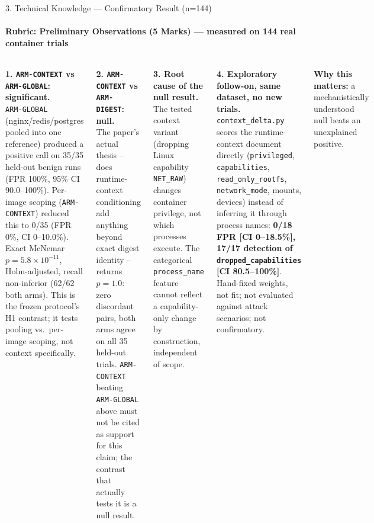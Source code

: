 \documentclass[aspectratio=169, 11pt]{beamer}
\begin{document}
\begin{frame}{3. Technical Knowledge --- Confirmatory Result (n=144)}
\framesubtitle{Rubric: Preliminary Observations (5 Marks) --- measured on 144 real container trials}

\begin{columns}[T]
\footnotesize
\textbf{1. \texttt{ARM-CONTEXT} vs \texttt{ARM-GLOBAL}: significant.}\\
\texttt{ARM-GLOBAL} (nginx/redis/postgres pooled into one reference)
produced a positive call on 35/35 held-out benign runs (FPR 100\%, 95\% CI
90.0--100\%). Per-image scoping (\texttt{ARM-CONTEXT}) reduced this to 0/35
(FPR 0\%, CI 0--10.0\%). Exact McNemar $p=5.8\times10^{-11}$, Holm-adjusted,
recall non-inferior (62/62 both arms). This is the frozen protocol's H1
contrast; it tests pooling vs.\ per-image scoping, not context specifically.

\medskip
\textbf{2. \texttt{ARM-CONTEXT} vs \texttt{ARM-DIGEST}: null.}\\
The paper's actual thesis -- does runtime-context conditioning add anything
beyond exact digest identity -- returns $p=1.0$: zero discordant pairs, both
arms agree on all 35 held-out trials. \texttt{ARM-CONTEXT} beating
\texttt{ARM-GLOBAL} above must not be cited as support for this claim; the
contrast that actually tests it is a null result.

\footnotesize
\textbf{3. Root cause of the null result.}\\
The tested context variant (dropping Linux capability \texttt{NET\_RAW})
changes container privilege, not which processes execute. The categorical
\texttt{process\_name} feature cannot reflect a capability-only change by
construction, independent of scope.

\medskip
\textbf{4. Exploratory follow-on, same dataset, no new trials.}\\
\texttt{context\_delta.py} scores the runtime-context document directly
(\texttt{privileged}, \texttt{capabilities}, \texttt{read\_only\_rootfs},
\texttt{network\_mode}, mounts, devices) instead of inferring it through
process names: \textbf{0/18 FPR [CI 0--18.5\%], 17/17 detection of
\texttt{dropped\_capabilities} [CI 80.5--100\%]}. Hand-fixed weights, not
fit; not evaluated against attack scenarios; not confirmatory.

\smallskip
\textcolor{amritaMaroon}{\textbf{Why this matters:}} a mechanistically
understood null beats an unexplained positive.
\end{columns}
\end{frame}
\end{document}
